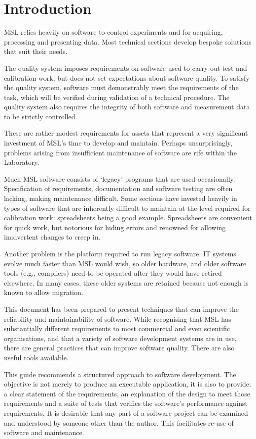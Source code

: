 \section{Introduction}
MSL relies heavily on software to control experiments and for acquiring, processing and presenting data. Most technical sections develop bespoke solutions that suit their needs. 

The quality system imposes requirements on software used to carry out test and calibration work, but does not set expectations about software quality. To satisfy the quality system, software must demonstrably meet the requirements of the task, which will be verified during validation of a technical procedure. The quality system also requires the integrity of both software and measurement data to be strictly controlled. 

These are rather modest requirements for assets that represent a very significant investment of MSL's time to develop and maintain.  Perhaps unsurprisingly, problems arising from insufficient maintenance of software are rife within the Laboratory. 

Much MSL software consists of `legacy' programs that are used occasionally. Specification of requirements, documentation and software testing are often lacking, making maintenance difficult. Some sections have invested heavily in types of software that are inherently difficult to maintain at the level required for calibration work: spreadsheets being a good example. Spreadsheets are convenient for quick work, but notorious for hiding errors and renowned for allowing inadvertent changes to creep in. 

Another problem is the platform required to run legacy software. IT systems evolve much faster than MSL would wish, so older hardware, and older software tools (e.g., compliers) need to be operated after they would have retired elsewhere. In many cases, these older systems are retained because not enough is known to allow migration.

This document has been prepared to present techniques that can improve the reliability and maintainability of software. While recognising that MSL has substantially different requirements to most commercial and even scientific organisations, and that a variety of software development systems are in use, there are general practices that can improve software quality. There are also useful tools available. 

This guide recommends a structured approach to software development. The objective is not merely to produce an executable application, it is also to provide: a clear statement of the requirements, an explanation of the design to meet those requirements and a suite of tests that verifies the software's performance against requirements. It is desirable that any part of a software project can be examined and understood by someone other than the author. This facilitates re-use of software and maintenance. 

